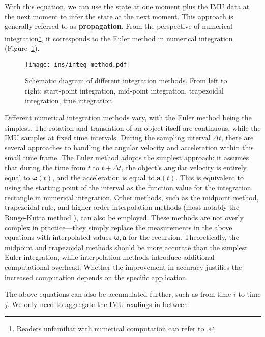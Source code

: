 With this equation, we can use the state at one moment plus the IMU data at the next moment to infer the state at the next moment. This approach is generally referred to as \textbf{propagation}. From the perspective of numerical integration\footnote{Readers unfamiliar with numerical computation can refer to \cite{LiQinYang2001}.}, it corresponds to the Euler method in numerical integration (Figure~\ref{fig:integ-method}).

\begin{figure}
	\centering
	\texttt{[image: ins/integ-method.pdf]}
	\caption{Schematic diagram of different integration methods. From left to right: start-point integration, mid-point integration, trapezoidal integration, true integration.}
	\label{fig:integ-method}
\end{figure}

Different numerical integration methods vary, with the Euler method being the simplest. The rotation and translation of an object itself are continuous, while the IMU samples at fixed time intervals. During the sampling interval $\Delta t$, there are several approaches to handling the angular velocity and acceleration within this small time frame. The Euler method adopts the simplest approach: it assumes that during the time from $t$ to $t+\Delta t$, the object's angular velocity is entirely equal to $\boldsymbol{\omega}(t)$, and the acceleration is equal to $\bm{a}(t)$. This is equivalent to using the starting point of the interval as the function value for the integration rectangle in numerical integration. Other methods, such as the midpoint method, trapezoidal rule, and higher-order interpolation methods (most notably the Runge-Kutta method \cite{Liu2020}), can also be employed. These methods are not overly complex in practice—they simply replace the measurements in the above equations with interpolated values $\tilde{\boldsymbol{\omega}}, \tilde{\bm{a}}$ for the recursion. Theoretically, the midpoint and trapezoidal methods should be more accurate than the simplest Euler integration, while interpolation methods introduce additional computational overhead. Whether the improvement in accuracy justifies the increased computation depends on the specific application.

The above equations can also be accumulated further, such as from time $i$ to time $j$. We only need to aggregate the IMU readings in between:


